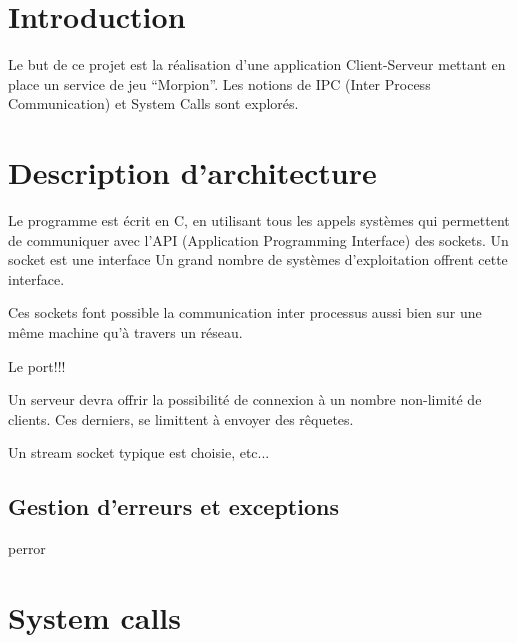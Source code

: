 \documentclass[11pt,a4paper]{article}
\begin{document}
\pagestyle{fancy}

\section{Introduction}
\label{sec:intro}

Le but de ce projet est la réalisation d'une application
Client-Serveur mettant en place un service de jeu ``Morpion''. Les
notions de IPC (Inter Process Communication) et System Calls sont
explorés.

\section{Description d'architecture}
\label{sec:des}

Le programme est écrit en C, en utilisant tous les appels systèmes qui
permettent de communiquer avec l'API (Application Programming
Interface) des sockets. Un socket est une interface Un grand nombre de systèmes d'exploitation
offrent cette interface.

\medbreak

Ces sockets font possible la communication inter processus aussi bien
sur une même machine qu'à travers un réseau.

\medbreak

Le port!!!

Un serveur devra offrir la possibilité de connexion à un nombre
non-limité de clients. Ces derniers, se limittent à envoyer des rêquetes.

Un stream socket typique est choisie, etc...

\subsection{Gestion d'erreurs et exceptions}
\label{sec:err}

perror

\section{System calls}
\label{sec:calls}
\end{document}
